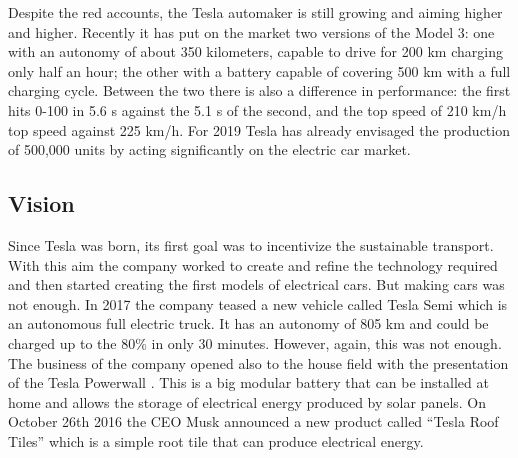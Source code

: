Despite the red accounts, the Tesla automaker is still growing and aiming higher and higher. Recently it has put on the market two versions of the Model 3: one with an autonomy of about 350 kilometers, capable to drive for 200 km charging only half an hour; the other with a battery capable of covering 500 km with a full charging cycle. Between the two there is also a difference in performance: the first hits 0-100 in 5.6 s against the 5.1 s of the second, and the top speed of 210 km/h top speed against 225 km/h. For 2019 Tesla has already envisaged the production of 500,000 units by acting significantly on the electric car market.



\subsection{Vision}
Since Tesla was born, its first goal was to incentivize the sustainable transport. With this aim the company worked to create and refine the technology required and then started creating the first models of electrical cars. But making cars was not enough. In 2017 the company teased a new vehicle called Tesla Semi which is an autonomous full electric truck. It has an autonomy of 805 km and could be charged up to the 80\% in only 30 minutes.
However, again, this was not enough. The business of the company opened also to the house field with the presentation of the Tesla Powerwall \cite{Powerwall}. This is a big modular battery that can be installed at home and allows the storage of electrical energy produced by solar panels. On October 26th 2016 the CEO Musk announced a new product called “Tesla Roof Tiles” which is a simple root tile that can produce electrical energy.



